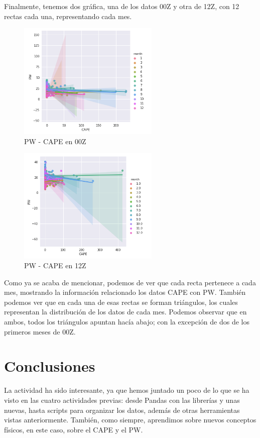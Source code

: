 \documentclass[a4paper]{article}
\begin{document}
\pagebreak
Finalmente, tenemos dos gráfica, una de los datos 00Z y otra de 12Z, con 12 rectas cada una, representando cada mes. 
\begin{figure}[ht!]
 \centering
  \includegraphics[width=0.6\textwidth]{00Z_Lmplot.png}
  \caption{PW - CAPE en 00Z}
\end{figure}
\begin{figure}[ht!]
 \centering
  \includegraphics[width=0.6\textwidth]{12Z_Lmplot.png}
  \caption{PW - CAPE en 12Z}
\end{figure}

Como ya se acaba de mencionar, podemos de ver que cada recta pertenece a cada mes, mostrando la información relacionado los datos CAPE con PW. También podemos ver que en cada una de esas rectas se forman triángulos, los cuales representan la distribución de los datos de cada mes. Podemos observar que en ambos, todos los triángulos apuntan hacía abajo; con la excepción de dos de los primeros meses de 00Z. 


\pagebreak
\section{Conclusiones}

La actividad ha sido interesante, ya que hemos juntado un poco de lo que se ha visto en las cuatro actividades previas: desde Pandas con las librerías  y unas nuevas, hasta scripts para organizar los datos, además de otras herramientas vistas  anteriormente. También, como siempre, aprendimos sobre nuevos conceptos físicos, en este caso, sobre el CAPE y el PW.
\end{document}
